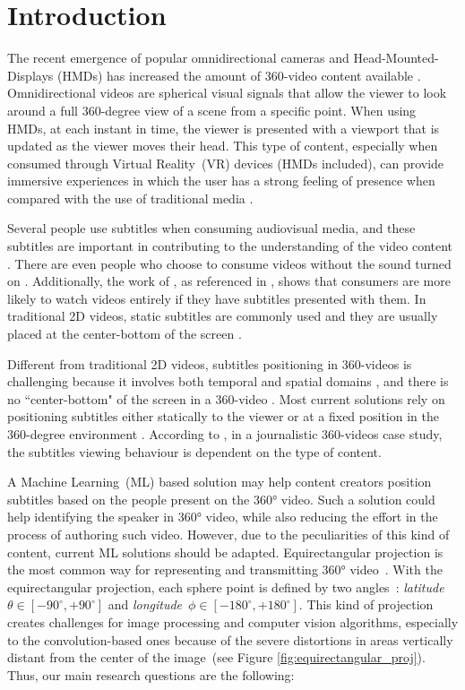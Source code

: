 \section{Introduction}

The recent emergence of popular omnidirectional cameras and Head-Mounted-Displays (HMDs) has increased the amount of 360-video content available \cite{mendes_2020}. Omnidirectional videos are spherical visual signals that allow the viewer to look around a full 360-degree view of a scene from a specific point. When using HMDs, at each instant in time, the viewer is presented with a viewport that is updated as the viewer moves their head. This type of content, especially when consumed through Virtual Reality~(VR) devices (HMDs included), can provide immersive experiences in which the user has a strong feeling of presence when compared with the use of traditional media \cite{montagud_culture_2020}.

Several people use subtitles when consuming audiovisual media, and these subtitles are important in contributing to the understanding of the video content \cite{brown_subtitles_2017}. There are even people who choose to consume videos without the sound turned on \cite{hughes_disruptive_2019}. Additionally, the work of \cite{hayati2011effect}, as referenced in \cite{hughes_disruptive_2019}, shows that consumers are more likely to watch videos entirely if they have subtitles presented with them. In traditional 2D videos, static subtitles are commonly used and they are usually placed at the center-bottom of the screen \cite{rothe_dynamic_2018}.

Different from traditional 2D videos, subtitles positioning in 360-videos is challenging because it involves both temporal and spatial domains \cite{agullo2019making}, and there is no ``center-bottom" of the screen in a 360-video \cite{brown_subtitles_2017}. Most current solutions rely on positioning subtitles either statically to the viewer or at a fixed position in the 360-degree environment \cite{mendes_2020}. According to \cite{li_impacts_2018}, in a journalistic 360-videos case study, the subtitles viewing behaviour is dependent on the type of content. 

A Machine Learning~(ML) based solution may help content creators position subtitles based on the people present on the 360° video. Such a solution could help identifying the speaker in 360° video, while also reducing the effort in the process of authoring such video. However, due to the peculiarities of this kind of content, current ML solutions should be adapted. Equirectangular projection is the most common way for representing and transmitting 360° video~\cite{yang2018object}. With the equirectangular projection, each sphere point is defined by two angles~\cite{snyder1987map}: \emph{latitude}~$\theta \in [-90^{\circ}, +90^{\circ}]$ and \emph{longitude}~$\phi \in [-180^{\circ}, +180^{\circ}]$. This kind of projection creates challenges for image processing and computer vision algorithms, especially to the convolution-based ones because of the severe distortions in areas vertically distant from the center of the image~(see Figure \ref{fig:equirectangular_proj}). Thus, our main research questions are the following:

